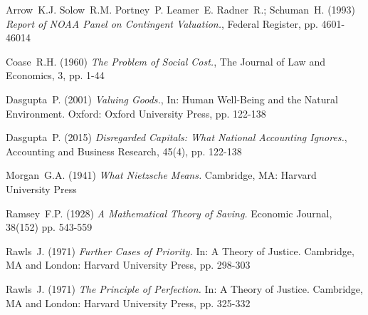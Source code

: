 \documentclass[11pt, oneside]{article}   	%
\begin{document}
\begin{thebibliography}{99}

 Arrow~K.J. Solow~R.M. Portney~P. Leamer~E. Radner~R.; Schuman~H. (1993)
\emph{Report of NOAA Panel on Contingent Valuation.},
Federal Register, pp. 4601-46014
	
 Coase~R.H. (1960)
\emph{The Problem of Social Cost.},
The Journal of Law and Economics, 3, pp. 1-44
	
 Dasgupta~P. (2001)
\emph{Valuing Goods.},
In: Human Well-Being and the Natural Environment. Oxford: Oxford University Press, pp. 122-138
	
 Dasgupta~P. (2015)
\emph{Disregarded Capitals: What National Accounting Ignores.},
Accounting and Business Research, 45(4), pp. 122-138
	
 Morgan~G.A. (1941)
\emph{What Nietzsche Means.}
Cambridge, MA: Harvard University Press
	
 Ramsey~F.P. (1928)
\emph{A Mathematical Theory of Saving.}
Economic Journal, 38(152) pp. 543-559
	
 Rawls~J. (1971)
\emph{Further Cases of Priority.}
In: A Theory of Justice. Cambridge, MA and London: Harvard University Press, pp. 298-303
	
 Rawls~J. (1971)
\emph{The Principle of Perfection.}
In: A Theory of Justice. Cambridge, MA and London: Harvard University Press, pp. 325-332

\end{thebibliography}
\end{document}
